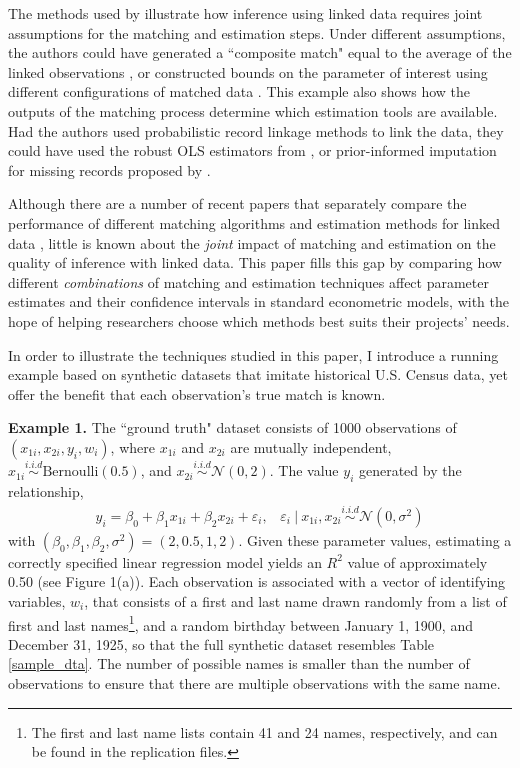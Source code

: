 \documentclass[12pt]{article}
\begin{document}
The methods used by \cite{aizer2016} illustrate how inference using linked data requires joint assumptions for the matching and estimation steps.  Under different assumptions, the authors could have generated a ``composite match" equal to the average of the linked observations \citep{bleakley2016}, or constructed bounds on the parameter of interest using different configurations of matched data \citep{nq2015}.   This example also shows how the outputs of the matching process determine which estimation tools are available.  Had the authors used probabilistic record linkage methods to link the data, they could have used the robust OLS estimators from \cite{lahiri05}, or prior-informed imputation for missing records proposed by \cite{Goldstein2012}.   

Although there are a number of recent papers that separately compare the performance of different matching algorithms  \citep{bailey2017, arp2018} and estimation methods for linked data \citep{harron2014}, little is known about the \textit{joint} impact of matching and estimation on the quality of inference with linked data.  This paper fills this gap by comparing how different \textit{combinations} of matching and estimation techniques affect parameter estimates and their confidence intervals in standard econometric models, with the hope of helping researchers choose which methods best suits their projects' needs. 

In order to illustrate the techniques studied in this paper, I introduce a running example based on synthetic datasets that imitate historical U.S. Census data, yet offer the benefit that each observation's true match is known.  

\textbf{Example 1.}   The ``ground truth" dataset consists of 1000 observations of $(x_{1i}, x_{2i}, y_i, w_i)$, where $x_{1i}$ and $x_{2i}$ are mutually independent, $x_{1i} \overset{i.i.d}{\sim} \text{Bernoulli}(0.5)$, and $x_{2i} \overset{i.i.d}{\sim} \mathcal{N}(0, 2)$.  The value $y_i$ generated by the relationship,
\begin{gather}
y_i = \beta_0 + \beta_1 x_{1i} + \beta_2 x_{2i} + \varepsilon_i, \hspace{10pt} 
\varepsilon_i\  |\  x_{1i}, x_{2i} \overset{i.i.d}{\sim} \mathcal{N}(0, \sigma^2) 
\end{gather}
with $(\beta_0, \beta_1, \beta_2, \sigma^2) = (2, 0.5, 1, 2)$.  Given these parameter values, estimating a correctly specified linear regression model yields an $R^2$ value of approximately 0.50 (see Figure 1(a)).  Each observation is associated with a vector of identifying variables, $w_i$, that consists of a first and last name drawn randomly from a list of first and last names\footnote{The first and last name lists contain 41 and 24 names, respectively, and can be found in the replication files.}, and a random birthday between January 1, 1900, and December 31, 1925, so that the full synthetic dataset resembles Table \ref{sample_dta}.  The number of possible names is smaller than the number of observations to ensure that there are multiple observations with the same name. 
 
\end{document}
